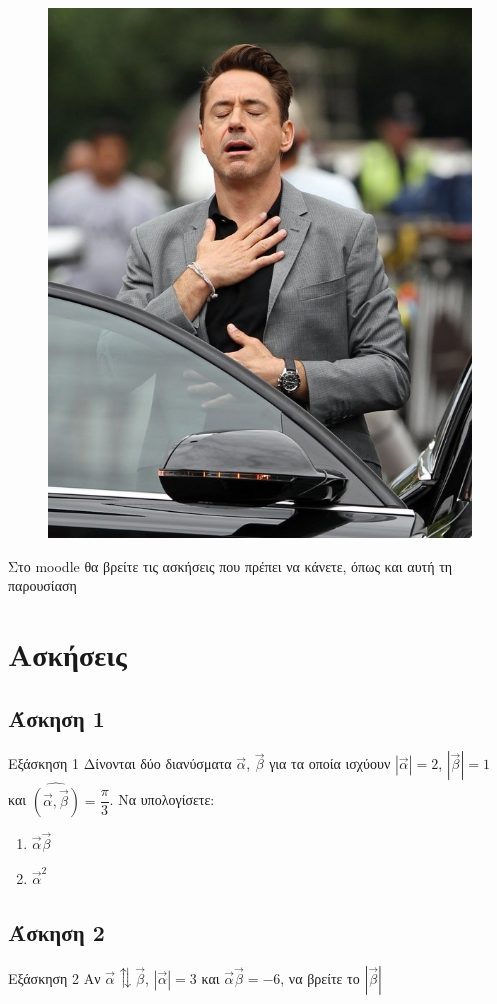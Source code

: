 \documentclass[greek]{beamer}
\begin{document}
\begin{frame}
      \begin{figure}
            \centering
            \includegraphics[width=0.5 \textwidth]{"../images/relief"}
      \end{figure}
\end{frame}

\begin{frame}
      Στο moodle θα βρείτε τις ασκήσεις που πρέπει να κάνετε, όπως και αυτή τη παρουσίαση
\end{frame}

\section{Ασκήσεις}

\subsection{Άσκηση 1}
\begin{frame}[label=Άσκηση1,t]{Εξάσκηση 1}
      Δίνονται δύο διανύσματα $\vec{α}$, $\vec{β}$ για τα οποία ισχύουν $|\vec{α}|=2$, $|\vec{β}|=1$ και $\widehat{(\vec{α }, \vec{β })}=\dfrac{\pi}{3}$. Να υπολογίσετε:
      \begin{enumerate}
            \item<1-> $\vec{α}\vec{β}$
            \item<2-> $\vec{α}^2$
      \end{enumerate}
\end{frame}

\subsection{Άσκηση 2}
\begin{frame}[label=Άσκηση2,t]{Εξάσκηση 2}
      Αν $\vec{α}\updownarrows\vec{β}$, $|\vec{α}|=3$ και $\vec{α}\vec{β}=-6$, να βρείτε το $|\vec{β}|$
\end{frame}
\end{document}

